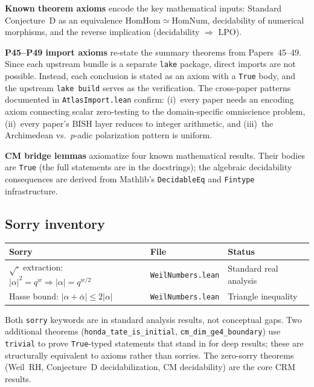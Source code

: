 \documentclass[11pt]{article}
\theoremstyle{definition}
\theoremstyle{remark}
\newcommand{\LPO}{\mathrm{LPO}}
\newcommand{\BISH}{\mathrm{BISH}}
\newcommand{\CRM}{\mathrm{CRM}}
\begin{document}
\textbf{Known theorem axioms} encode the key mathematical inputs: Standard Conjecture~D as an equivalence $\mathrm{HomHom} \simeq \mathrm{HomNum}$, decidability of numerical morphisms, and the reverse implication (decidability $\Rightarrow$ $\LPO$).

\textbf{P45--P49 import axioms} re-state the summary theorems from Papers~45--49. Since each upstream bundle is a separate \texttt{lake} package, direct imports are not possible. Instead, each conclusion is stated as an axiom with a \texttt{True} body, and the upstream \texttt{lake build} serves as the verification. The cross-paper patterns documented in \texttt{AtlasImport.lean} confirm: (i)~every paper needs an encoding axiom connecting scalar zero-testing to the domain-specific omniscience problem, (ii)~every paper's $\BISH$ layer reduces to integer arithmetic, and (iii)~the Archimedean vs.\ $p$-adic polarization pattern is uniform.

\textbf{CM bridge lemmas} axiomatize four known mathematical results. Their bodies are \texttt{True} (the full statements are in the docstrings); the algebraic decidability consequences are derived from Mathlib's \texttt{DecidableEq} and \texttt{Fintype} infrastructure.

\subsection{Sorry inventory}

\begin{center}
\begin{tabular}{lll}
\toprule
\textbf{Sorry} & \textbf{File} & \textbf{Status} \\
\midrule
$\sqrt{\cdot}$ extraction: $|\alpha|^2 = q^w \Rightarrow |\alpha| = q^{w/2}$ & \texttt{WeilNumbers.lean} & Standard real analysis \\
Hasse bound: $|\alpha + \bar\alpha| \leq 2|\alpha|$ & \texttt{WeilNumbers.lean} & Triangle inequality \\
\bottomrule
\end{tabular}
\end{center}

\smallskip\noindent
Both \texttt{sorry} keywords are in standard analysis results, not conceptual gaps. Two additional theorems (\texttt{honda\_tate\_is\_initial}, \texttt{cm\_dim\_ge4\_boundary}) use \texttt{trivial} to prove \texttt{True}-typed statements that stand in for deep results; these are structurally equivalent to axioms rather than sorries. The zero-sorry theorems (Weil~RH, Conjecture~D decidabilization, CM decidability) are the core $\CRM$ results.
\end{document}
